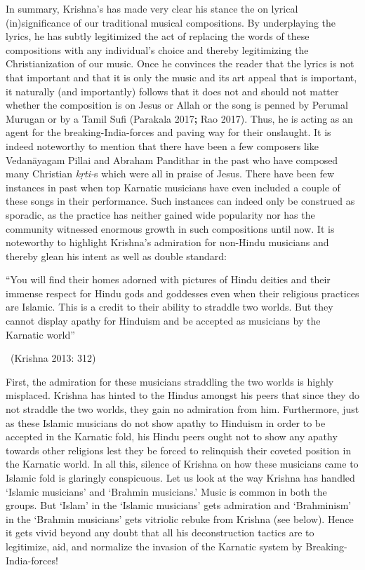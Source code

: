 In summary, Krishna’s has made very clear his stance the on lyrical (in)significance of our traditional musical compositions. By underplaying the lyrics, he has subtly legitimized the act of replacing the words of these compositions with any individual’s choice and thereby legitimizing the Christianization of our music. Once he convinces the reader that the lyrics is not that important and that it is only the music and its art appeal that is important, it naturally (and importantly) follows that it does not and should not matter whether the composition is on Jesus or Allah or the song is penned by Perumal Murugan or by a Tamil Sufi (Parakala 2017\textbf{; }Rao 2017). Thus, he is acting as an agent for the breaking-India-forces and paving way for their onslaught. It is indeed noteworthy to mention that there have been a few composers like Vedanāyagam Pillai and Abraham Pandithar in the past who have composed many Christian \textit{kṛti-}s which were all in praise of Jesus. There have been few instances in past when top Karnatic musicians have even included a couple of these songs in their performance. Such instances can indeed only be construed as sporadic, as the practice has neither gained wide popularity nor has the community witnessed enormous growth in such compositions until now. It is noteworthy to highlight Krishna’s admiration for non-Hindu musicians and thereby glean his intent as well as double standard:

\begin{myquote}
“You will find their homes adorned with pictures of Hindu deities and their immense respect for Hindu gods and goddesses even when their religious practices are Islamic. This is a credit to their ability to straddle two worlds. But they cannot display apathy for Hinduism and be accepted as musicians by the Karnatic world” 

~\hfill (Krishna 2013: 312)
\end{myquote}

First, the admiration for these musicians straddling the two worlds is highly misplaced. Krishna has hinted to the Hindus amongst his peers that since they do not straddle the two worlds, they gain no admiration from him. Furthermore, just as these Islamic musicians do not show apathy to Hinduism in order to be accepted in the Karnatic fold, his Hindu peers ought not to show any apathy towards other religions lest they be forced to relinquish their coveted position in the Karnatic world. In all this, silence of Krishna on how these musicians came to Islamic fold is glaringly conspicuous. Let us look at the way Krishna has handled ‘Islamic musicians’ and ‘Brahmin musicians.’ Music is common in both the groups. But ‘Islam’ in the ‘Islamic musicians’ gets admiration and ‘Brahminism’ in the ‘Brahmin musicians’ gets vitriolic rebuke from Krishna (see below). Hence it gets vivid beyond any doubt that all his deconstruction tactics are to legitimize, aid, and normalize the invasion of the Karnatic system by Breaking-India-forces!

